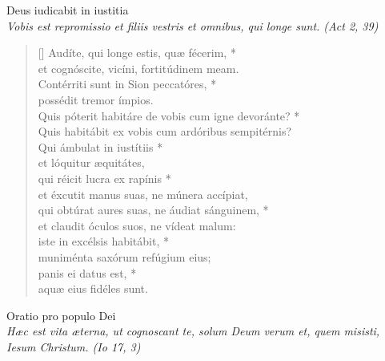 \vspace{0.3cm}
\begin{center}


Deus iudicabit in iustitia\\
\textit{\small Vobis est repromissio et filiis vestris et omnibus, qui longe sunt. (Act 2, 39)}
\end{center}
\begin{verse}[\versewidth]
Audíte, qui longe estis, quæ fécerim, *\\
et cognóscite, vicíni, fortitúdinem meam.\\
\vin Contérriti sunt in Sion peccatóres, *\\
\vin possédit tremor ímpios.\\
Quis póterit habitáre de vobis cum igne devoránte? *\\
Quis habitábit ex vobis cum ardóribus sempitérnis?\\

\vin Qui ámbulat in iustítiis *\\
\vin et lóquitur æquitátes, \\
qui réicit lucra ex rapínis *\\
et éxcutit manus suas, ne múnera accípiat,\\
\vin qui obtúrat aures suas, ne áudiat sánguinem, *\\
\vin et claudit óculos suos, ne vídeat malum:\\
iste in excélsis habitábit, *\\
muniménta saxórum refúgium eius;\\
\vin panis ei datus est, *\\
\vin aquæ eius fidéles sunt.\\
\end{verse}


\vspace{0.3cm}
\begin{center}
Oratio pro populo Dei\\
\textit{\small Hæc est vita æterna, ut cognoscant te, solum Deum verum et, quem misisti, Iesum Christum. (Io 17, 3)}
\end{center}

